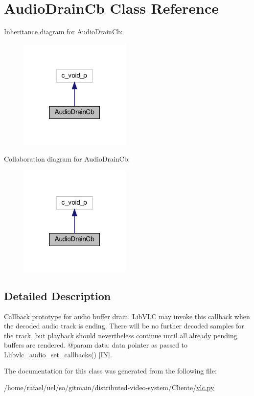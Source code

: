 \hypertarget{classvlc_1_1_audio_drain_cb}{}\section{Audio\+Drain\+Cb Class Reference}
\label{classvlc_1_1_audio_drain_cb}


Inheritance diagram for Audio\+Drain\+Cb\+:
\nopagebreak
\begin{figure}[H]
\begin{center}
\leavevmode
\includegraphics[width=157pt]{classvlc_1_1_audio_drain_cb__inherit__graph}
\end{center}
\end{figure}


Collaboration diagram for Audio\+Drain\+Cb\+:
\nopagebreak
\begin{figure}[H]
\begin{center}
\leavevmode
\includegraphics[width=157pt]{classvlc_1_1_audio_drain_cb__coll__graph}
\end{center}
\end{figure}


\subsection{Detailed Description}
\begin{DoxyVerb}Callback prototype for audio buffer drain.
LibVLC may invoke this callback when the decoded audio track is ending.
There will be no further decoded samples for the track, but playback should
nevertheless continue until all already pending buffers are rendered.
@param data: data pointer as passed to L{libvlc_audio_set_callbacks}() [IN].
\end{DoxyVerb}
 

The documentation for this class was generated from the following file\+:\begin{DoxyCompactItemize}
\item 
/home/rafael/uel/so/gitmain/distributed-\/video-\/system/\+Cliente/\hyperlink{vlc_8py}{vlc.\+py}\end{DoxyCompactItemize}
